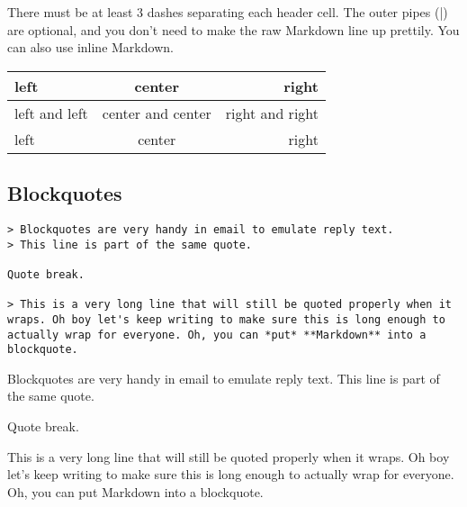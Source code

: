 \documentclass[a4paper, 11pt]{gfm}
\begin{document}
There must be at least 3 dashes separating each header cell. The outer pipes (|) are optional, and you don't need to make the raw Markdown line up prettily. You can also use inline Markdown. \\


\begin{tabular}{|l|c|r|}
\hline
left & center & right \\\hline
left and left & center and center & right and right \\\hline
left & center & right \\\hline
\end{tabular}


\subsection{Blockquotes}

\begin{lstlisting}
> Blockquotes are very handy in email to emulate reply text.
> This line is part of the same quote.

Quote break.

> This is a very long line that will still be quoted properly when it wraps. Oh boy let's keep writing to make sure this is long enough to actually wrap for everyone. Oh, you can *put* **Markdown** into a blockquote.
\end{lstlisting}
\begin{blockquote}
Blockquotes are very handy in email to emulate reply text. This line is part of the same quote.
\end{blockquote}

Quote break.

\begin{blockquote}
This is a very long line that will still be quoted properly when it wraps. Oh boy let's keep writing to make sure this is long enough to actually wrap for everyone. Oh, you can put Markdown into a blockquote.
\end{blockquote}
\end{document}

